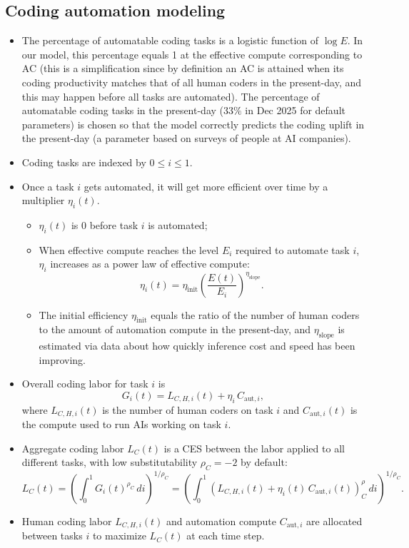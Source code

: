 \documentclass{article}
\theoremstyle{definition}
\newcommand{\ATODO}[1]{\textcolor{red}{ALEX-TODO: #1}}
\begin{document}
\subsection{Coding automation modeling}

\begin{itemize}
\item The percentage of automatable coding tasks is a logistic function of $\log E$. In our model, this percentage equals 1 at the effective compute corresponding to AC (this is a simplification since by definition an AC is attained when its coding productivity matches that of all human coders in the present-day, and this may happen before all tasks are automated). The percentage of automatable coding tasks in the present-day ($33\%$ in Dec 2025 for default parameters) is chosen so that the model correctly predicts the coding uplift in the present-day (a parameter based on surveys of people at AI companies).
\item Coding tasks are indexed by $0 \leq i \leq 1$.
\item Once a task $i$ gets automated, it will get more efficient over time by a multiplier $\eta_i(t)$.
\begin{itemize}
\item $\eta_i(t)$ is 0 before task $i$ is automated;
\item When effective compute reaches the level $E_i$ required to automate task $i$, $\eta_i$ increases as a power law of effective compute:
\[ \eta_i(t) = \eta_\text{init} \left(\frac{E(t)}{E_i}\right)^{\eta_\text{slope}}.\]
\item The initial efficiency $\eta_\text{init}$ equals the ratio of the number of human coders to the amount of automation compute in the present-day, and $\eta_\text{slope}$ is estimated via data about how quickly inference cost and speed has been improving.
\end{itemize}
\item Overall coding labor for task $i$ is
\[G_i(t) = L_{C,H,i}(t) + \eta_i \, C_{\text{aut},i},\]
where $L_{C,H,i}(t)$ is the number of human coders on task $i$ and $C_{\text{aut},i}(t)$ is the compute used to run AIs working on task $i$.
\item Aggregate coding labor $L_C(t)$ is a CES between the labor applied to all different tasks, with low substitutability $\rho_C = -2$ by default:
\[ L_C(t) = \left( \int_0^1 G_i(t)^{\rho_C} \, di \right)^{1/\rho_C} = \left( \int_0^1 \left(L_{C,H,i}(t)+\eta_i(t) \, C_{\text{aut},i}(t) \right)^\rho_C \, di \right)^{1/\rho_C}.\]
\item Human coding labor $L_{C,H,i}(t)$ and automation compute $C_{\text{aut},i}$ are allocated between tasks $i$ to maximize $L_C(t)$ at each time step.
\end{itemize}
\end{document}
